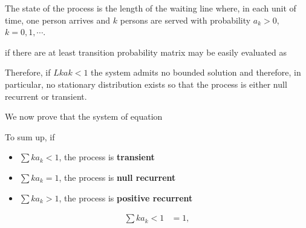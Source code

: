 \documentclass[12pt]{article}
\theoremstyle{nonumberbreak}
\begin{document}
The state of the process is the length of the waiting line where, in each unit of time, one person arrives and $k$ persons are served with probability $a_k > 0$, $k=0,1,\cdots$. 


if there are at least transition probability matrix may be easily evaluated as



Therefore, if $L kak < 1$ the system admits no bounded solution and therefore, in particular, no stationary distribution exists so that the process is either null recurrent or transient. 

We now prove that the system of equation


To sum up, if

\begin{itemize}
	\item $\sum k a_k < 1$, the process is \textbf{transient}
	\item $\sum k a_k = 1$, the process is \textbf{null recurrent}
	\item $\sum k a_k > 1$, the process is \textbf{positive recurrent}
\end{itemize}

$$
\begin{aligned}
\sum k a_k <1 &= 1, \\[8pt]
\end{aligned}
$$
\end{document}
